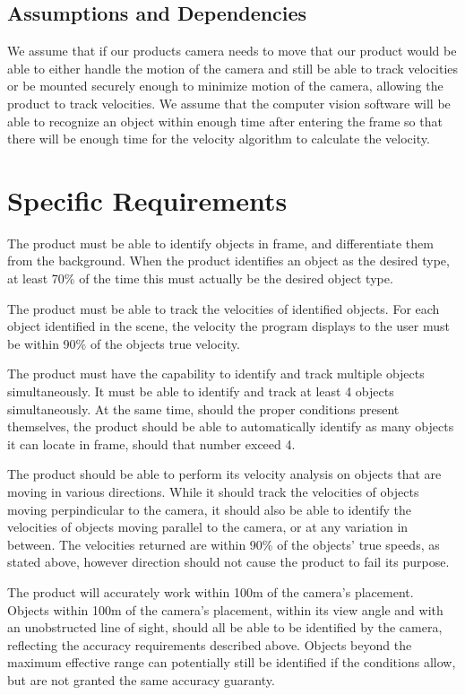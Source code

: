 \documentclass[letterpaper,10pt,onecolumn,draftclsnofoot]{IEEEtran}
\begin{document}
\subsection{Assumptions and Dependencies}
We assume that if our products camera needs to move that our product would be able to either handle the motion of the camera and still be able to track velocities or be mounted securely enough to minimize motion of the camera, allowing the product to track velocities.
We assume that the computer vision software will be able to recognize an object within enough time after entering the frame so that there will be enough time for the velocity algorithm to calculate the velocity.

\section{Specific Requirements}
The product must be able to identify objects in frame, and differentiate them from the background.
When the product identifies an object as the desired type, at least 70\% of the time this must actually be the desired object type.

The product must be able to track the velocities of identified objects.
For each object identified in the scene, the velocity the program displays to the user must be within 90\% of the objects true velocity.

The product must have the capability to identify and track multiple objects simultaneously.
It must be able to identify and track at least 4 objects simultaneously.
At the same time, should the proper conditions present themselves, the product should be able to automatically identify as many objects it can locate in frame, should that number exceed 4.

The product should be able to perform its velocity analysis on objects that are moving in various directions.
While it should track the velocities of objects moving perpindicular to the camera, it should also be able to identify the velocities of objects moving parallel to the camera, or at any variation in between.
The velocities returned are within 90\% of the objects' true speeds, as stated above, however direction should not cause the product to fail its purpose.

The product will accurately work within 100m of the camera's placement.
Objects within 100m of the camera's placement, within its view angle and with an unobstructed line of sight, should all be able to be identified by the camera, reflecting the accuracy requirements described above.
Objects beyond the maximum effective range can potentially still be identified if the conditions allow, but are not granted the same accuracy guaranty.
\end{document}
